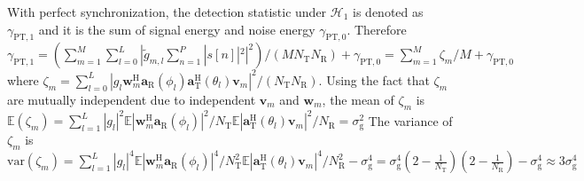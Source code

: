 \documentclass[journal]{IEEEtran}
\newcommand{\tx}[0]{\text{T}}
\newcommand{\rx}[0]{\text{R}}
\newcommand{\hermitian}[0]{\text{H}}
\newcommand{\var}[0]{\mathrm{var}}
\begin{document}
With perfect synchronization, the detection statistic under $\mathcal{H}_1$ is denoted as $\gamma_{\text{PT},1}$ and it is the sum of signal energy and noise energy $\gamma_{\text{PT},0}$. Therefore
$\gamma_{\text{PT},1} = (\sum_{m=1}^{M}\sum_{l=0}^{L}|\tilde{g}_{m,l}\sum_{n=1}^{P}|s[n]|^2|^2)/(MN_{\tx}N_{\rx}) + \gamma_{\text{PT},0}
= \sum_{m=1}^{M}\zeta_m/M + \gamma_{\text{PT},0}$
where $\zeta_m=\sum_{l=0}^{L}|g_l\mathbf{w}^{\hermitian}_m\mathbf{a}_{\rx}(\phi_l)\mathbf{a}^{\hermitian}_{\tx}(\theta_l)\mathbf{v}_m|^2/(N_{\tx}N_{\rx})$. Using the fact that $\zeta_m$ are mutually independent due to independent $\mathbf{v}_m$ and $\mathbf{w}_m$, the mean of $\zeta_m$ is $\mathbb{E}(\zeta_{m}) = \sum_{l=1}^{L}\left|g_l\right|^2\mathbb{E}\left|\mathbf{w}^{\hermitian}_m\mathbf{a}_{\rx}(\phi_l)\right|^2/N_{\tx}\mathbb{E}\left|\mathbf{a}^{\hermitian}_{\tx}(\theta_l)\mathbf{v}_m\right|^2/N_{\rx} = \sigma_{\text{g}}^2$
The variance of $\zeta_m$ is
$\var(\zeta_{m}) = \sum_{l=1}^{L}\left|g_l\right|^4\mathbb{E}\left|\mathbf{w}^{\hermitian}_m\mathbf{a}_{\rx}(\phi_l)\right|^4/N^2_{\tx}\mathbb{E}\left|\mathbf{a}^{\hermitian}_{\tx}(\theta_l)\mathbf{v}_m\right|^4/N^2_{\rx}-\sigma_{\text{g}}^4
=\sigma_{\text{g}}^4\left(2-\frac{1}{N_{\tx}}\right)\left(2-\frac{1}{N_{\rx}}\right)-\sigma_{\text{g}}^4 \approx 3\sigma_{\text{g}}^4$
\end{document}
